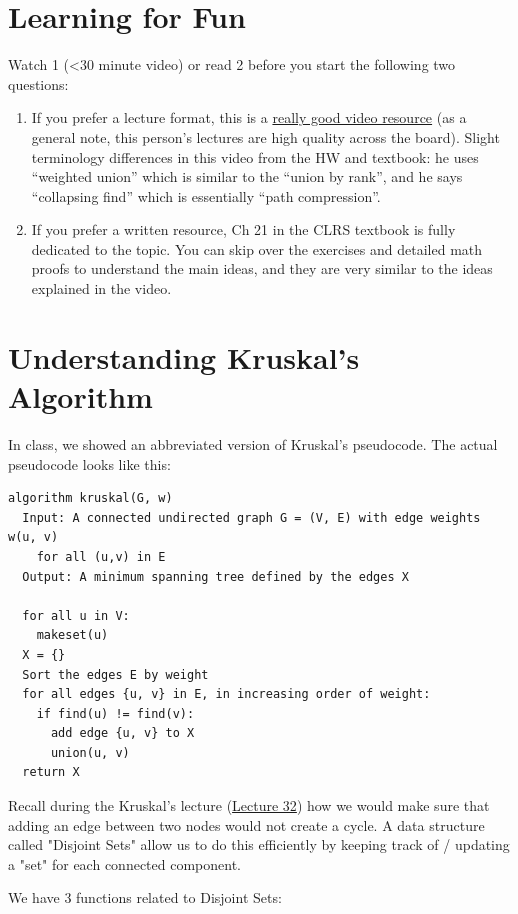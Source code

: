\documentclass [12pt]{article}
\begin{document}
\section{Learning for Fun }
Watch 1 (<30 minute video) or read 2 before you start the following two questions:

\begin{enumerate}
  \item If you prefer a lecture format, this is a \href{https://www.youtube.com/watch?v=wU6udHRIkcc}{really good video resource} (as a general note, this person's lectures are high quality across the board). Slight terminology differences in this video from the HW and textbook: he uses “weighted union” which is similar to the “union by rank”, and he says “collapsing find” which is essentially “path compression”.
  \item If you prefer a written resource, Ch 21 in the CLRS textbook is fully dedicated to the topic. You can skip over the exercises and detailed math proofs to understand the main ideas, and they are very similar to the ideas explained in the video.
\end{enumerate}

\pagebreak
\section{Understanding Kruskal's Algorithm }
In class, we showed an abbreviated version of Kruskal's pseudocode. The actual pseudocode looks like this:

\begin{verbatim}
algorithm kruskal(G, w)
  Input: A connected undirected graph G = (V, E) with edge weights w(u, v) 
    for all (u,v) in E
  Output: A minimum spanning tree defined by the edges X

  for all u in V:
    makeset(u)
  X = {}
  Sort the edges E by weight
  for all edges {u, v} in E, in increasing order of weight:
    if find(u) != find(v):
      add edge {u, v} to X
      union(u, v)
  return X
\end{verbatim}

Recall during the Kruskal's lecture (\href{https://www.comp285-fall22.ml/lectures/#kruskal-s-algorithm-and-max-flow}{Lecture 32}) how we would make sure that adding an edge between two nodes would not create a cycle. A data structure called "Disjoint Sets" allow us to do this efficiently by keeping track of / updating a "set" for each connected component.

We have 3 functions related to Disjoint Sets:
\end{document}
